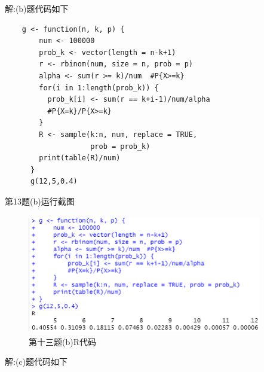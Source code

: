 \documentclass{book}
\begin{document}
\noindent
解:(b)题代码如下
\lstset{language = R}
\begin{lstlisting}
    g <- function(n, k, p) {
        num <- 100000
        prob_k <- vector(length = n-k+1)
        r <- rbinom(num, size = n, prob = p)
        alpha <- sum(r >= k)/num  #P{X>=k}
        for(i in 1:length(prob_k)) {
          prob_k[i] <- sum(r == k+i-1)/num/alpha
          #P{X=k}/P{X>=k}
        }
        R <- sample(k:n, num, replace = TRUE,
                    prob = prob_k)
        print(table(R)/num)
      }
      g(12,5,0.4)
\end{lstlisting}
第13题(b)运行截图
\begin{figure}[H]
  \centering
  \includegraphics*[height = 5.2cm, width = 10.2cm]{gramFile/第十三题(b)运行截图.PNG}
  \caption{第十三题(b)R代码}
\end{figure}
\noindent
解:(c)题代码如下
\lstset{language = R}
\end{document}

